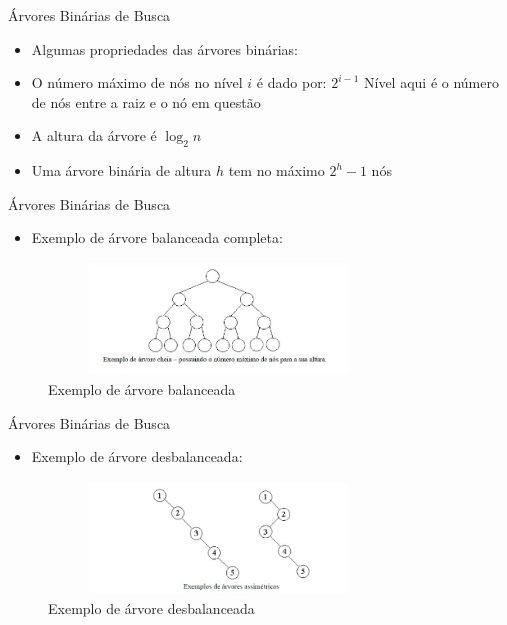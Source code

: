 \begin{frame}
	\begin{block}{Árvores Binárias de Busca}
		\begin{itemize}
			\item Algumas propriedades das árvores binárias:

			\item O número máximo de nós no nível $i$ é dado por: $2^{i-1}$ Nível aqui é o número de nós entre a raiz e o nó em questão
			
			\item A altura da árvore é $\log_{2} n$
			
			\item Uma árvore binária de altura $h$ tem no máximo $2^{h} -1$ nós
		\end{itemize}
	\end{block}
\end{frame}

\begin{frame}
	\begin{block}{Árvores Binárias de Busca}
		\begin{itemize}
			\item Exemplo de árvore balanceada completa:
		\end{itemize}
		\begin{figure}[!htb]
			\centering	  				
			\includegraphics[height=3cm, width = 9cm]{./pic/arvoreCompleta.jpg}
			\caption{Exemplo de árvore balanceada \cite{GEEKS_2018}}
		\end{figure}
	\end{block}
\end{frame}


\begin{frame}
	\begin{block}{Árvores Binárias de Busca}
		\begin{itemize}
			\item Exemplo de árvore desbalanceada:
		\end{itemize}
		\begin{figure}[!htb]
			\centering	  				
			\includegraphics[height=3cm, width = 9cm]{./pic/arvoresAssimetricas.jpg}
			\caption{Exemplo de árvore desbalanceada \cite{GEEKS_2018}}
		\end{figure}
	\end{block}
\end{frame}


